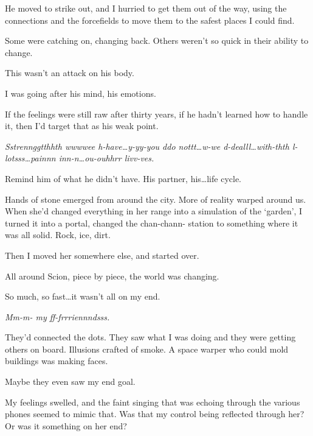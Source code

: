 He moved to strike out, and I hurried to get them out of the way, using the connections and the forcefields to move them to the safest places I could find.



Some were catching on, changing back.  Others weren't so quick in their ability to change.



This wasn't an attack on his body.



I was going after his mind, his emotions.



If the feelings were still raw after thirty years, if he hadn't learned how to handle it, then I'd target that as his weak point.



\emph{Sstrennggtthhth wwwwee h-have\ldots y-yy-you ddo nottt\ldots  w-we d-dealll\ldots with-thth l-lotsss\ldots painnn inn-n\ldots ou-ouhhrr livv-ves.}



Remind him of what he didn't have.  His partner, his\ldots life cycle.



Hands of stone emerged from around the city.  More of reality warped around us.  When she'd changed everything in her range into a simulation of the `garden', I turned it into a portal, changed the chan-chann- station to something where it was all solid.  Rock, ice, dirt.



Then I moved her somewhere else, and started over.



All around Scion, piece by piece, the world was changing.



So much, so fast\ldots it wasn't all on my end.



\emph{Mm-m- my ff-frrriennndsss.}



They'd connected the dots.  They saw what I was doing and they were getting others on board.  Illusions crafted of smoke.  A space warper who could mold buildings was making faces.



Maybe they even saw my end goal.



My feelings swelled, and the faint singing that was echoing through the various phones seemed to mimic that.  Was that my control being reflected through her?  Or was it something on her end?



